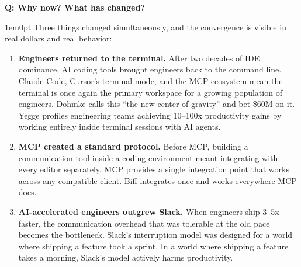 \documentclass[11pt,letterpaper]{article}
\newcounter{faqnum}
\newenvironment{faqpair}[1]{%
  \needspace{4\baselineskip}%
  \vspace{0.5em}%
  \refstepcounter{faqnum}%
  \noindent\textbf{\color{SectionBlue}Q\thefaqnum: #1}\par\nopagebreak[4]%
  \vspace{0.2em}%
  \begin{adjustwidth}{1em}{0pt}%
  \setlength{\parindent}{0pt}%
}{%
  \end{adjustwidth}%
  \vspace{0.5em}%
}
\begin{document}
\begin{faqpair}{Why now? What has changed?}\label{faq:why-now}
  Three things changed simultaneously, and the convergence is visible in
  real dollars and real behavior:

  \begin{enumerate}[leftmargin=1.5em]
    \item \textbf{Engineers returned to the terminal.} After two decades of
    IDE dominance, AI coding tools brought engineers back to the command
    line. Claude Code, Cursor's terminal mode, and the MCP ecosystem mean
    the terminal is once again the primary workspace for a growing
    population of engineers. Dohmke calls this ``the new center of
    gravity'' and bet \$60M on it. Yegge profiles engineering teams
    achieving 10--100x productivity gains by working entirely inside
    terminal sessions with AI agents.

    \item \textbf{MCP created a standard protocol.} Before MCP, building a
    communication tool inside a coding environment meant integrating with
    every editor separately. MCP provides a single integration point that
    works across any compatible client. Biff integrates once and works
    everywhere MCP does.

    \item \textbf{AI-accelerated engineers outgrew Slack.} When engineers
    ship 3--5x faster, the communication overhead that was tolerable at the
    old pace becomes the bottleneck. Slack's interruption model was
    designed for a world where shipping a feature took a sprint. In a world
    where shipping a feature takes a morning, Slack's model actively
    harms productivity.
  \end{enumerate}
\end{faqpair}
\end{document}

